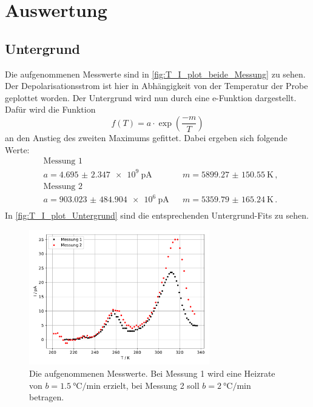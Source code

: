 \section{Auswertung}
\label{sec:Auswertung}

\subsection{Untergrund}
  Die aufgenommenen Messwerte sind in \autoref{fig:T_I_plot_beide_Messung} zu sehen.
  Der Depolarisationsstrom ist hier in Abhängigkeit von der Temperatur der Probe geplottet worden.
  Der Untergrund wird nun durch eine e-Funktion dargestellt.
  Dafür wird die Funktion
  \begin{equation*}
    f(T) = a \cdot \exp(\frac{-m}{T})
  \end{equation*}
  an den Anstieg des zweiten Maximums gefittet.
  Dabei ergeben sich folgende Werte:
  \begin{align*}
    &\text{Messung 1}\\
    &a =  \SI{4.695(2347)e9}{\pico\ampere} &&  m = \SI{5899.27(15055)}{\kelvin} \, ,\\
    &\text{Messung 2}\\
    &a = \SI{903.023(484904)e6}{\pico\ampere} &&  m = \SI{5359.79(16524)}{\kelvin} \, .\\
  \end{align*}
  In \autoref{fig:T_I_plot_Untergrund} sind die entsprechenden Untergrund-Fits zu sehen.

\begin{figure}
  \centering
  \includegraphics[width = 0.7\textwidth]{build/plot.pdf}
  \caption{Die aufgenommenen Messwerte. Bei Messung 1 wird eine Heizrate von $b = \SI{1.5}{\celsius\per\minute}$ erzielt, 
  bei Messung 2 soll $b = \SI{2}{\celsius\per\minute}$ betragen.}
  \label{fig:T_I_plot_beide_Messung}
\end{figure} %

